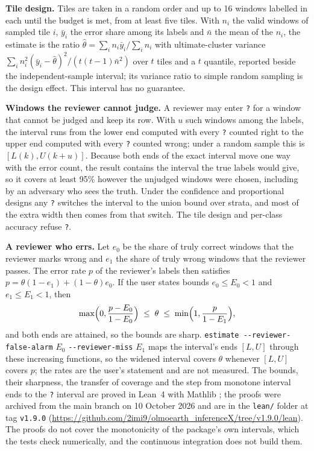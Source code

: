 \documentclass[11pt,a4paper]{article}
\newcommand{\code}[1]{\texttt{#1}}
\begin{document}
\textbf{Tile design.} Tiles are taken in a random order and up to 16 windows labelled in each until the budget is met,
from at least five tiles. With $n_i$ the valid windows of sampled tile $i$, $\bar y_i$ the error share among its
labels and $\bar n$ the mean of the $n_i$, the estimate is the ratio $\hat\theta = \sum_i n_i \bar y_i / \sum_i n_i$
with ultimate-cluster variance $\sum_i n_i^2 (\bar y_i - \hat\theta)^2 / (t(t-1)\bar n^2)$ over $t$ tiles and a $t$
quantile, reported beside the independent-sample interval; its variance ratio to simple random sampling is the design
effect. This interval has no guarantee.

\textbf{Windows the reviewer cannot judge.} A reviewer may enter \code{?} for a window that cannot be judged and keep
its row. With $u$ such windows among the labels, the interval runs from the lower end computed with every \code{?}
counted right to the upper end computed with every \code{?} counted wrong; under a random sample this is
$[L(k), U(k+u)]$. Because both ends of the exact interval move one way with the error count, the result contains the
interval the true labels would give, so it covers at least 95\% however the unjudged windows were chosen, including
by an adversary who sees the truth. Under the confidence and proportional designs any \code{?} switches the interval to
the union bound over strata, and most of the extra width then comes from that switch. The tile design and per-class
accuracy refuse \code{?}.

\textbf{A reviewer who errs.} Let $e_0$ be the share of truly correct windows that the reviewer marks wrong and $e_1$
the share of truly wrong windows that the reviewer passes. The error rate $p$ of the reviewer's labels then satisfies
$p = \theta(1 - e_1) + (1 - \theta) e_0$. If the user states bounds $e_0 \le E_0 < 1$ and $e_1 \le E_1 < 1$, then
\begin{equation}
  \max\Bigl(0, \frac{p - E_0}{1 - E_0}\Bigr) \;\le\; \theta \;\le\; \min\Bigl(1, \frac{p}{1 - E_1}\Bigr),
\end{equation}
and both ends are attained, so the bounds are sharp. \code{estimate -{}-reviewer-false-alarm} $E_0$
\code{-{}-reviewer-miss} $E_1$ maps the interval's ends $[L, U]$ through these increasing functions, so the widened
interval covers $\theta$ whenever $[L, U]$ covers $p$; the rates are the user's statement and are not measured. The
bounds, their sharpness, the transfer of coverage and the step from monotone interval ends to the \code{?} interval are
proved in Lean~4 \citep{demoura2021} with Mathlib \citep{mathlib2020}; the proofs were archived from the main branch
on 10 October 2026 and are in the \code{lean/} folder at tag \code{v1.9.0}
(\url{https://github.com/2imi9/olmoearth_inferenceX/tree/v1.9.0/lean}). The proofs do not cover the monotonicity of
the package's own intervals, which the tests check numerically, and the continuous integration does not build them.
\end{document}
